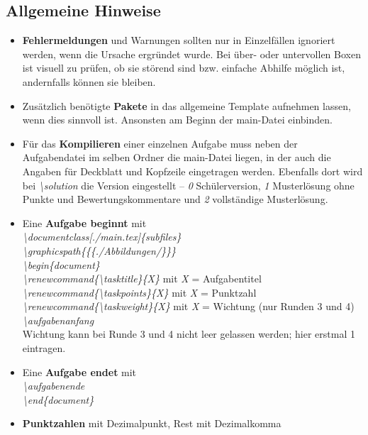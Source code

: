\documentclass[./main.tex]{subfiles}
\begin{document}
\subsection{Allgemeine Hinweise}
\begin{itemize}
    \item \textbf{Fehlermeldungen} und Warnungen sollten nur in Einzelf\"allen ignoriert werden, wenn die Ursache ergr\"undet wurde. Bei \"uber- oder untervollen Boxen ist visuell zu pr\"ufen, ob sie st\"orend sind bzw. einfache Abhilfe m\"oglich ist, andernfalls k\"onnen sie bleiben. 
    \item Zus\"atzlich ben\"otigte \textbf{Pakete} in das allgemeine Template aufnehmen lassen, wenn dies sinnvoll ist. Ansonsten am Beginn der main-Datei einbinden. 
    \item F\"ur das \textbf{Kompilieren} einer einzelnen Aufgabe muss neben der Aufgabendatei im selben Ordner die main-Datei liegen, in der auch die Angaben f\"ur Deckblatt und Kopfzeile eingetragen werden. Ebenfalls dort wird bei \hypertarget{solution}{\textit{\textbackslash solution}} die Version eingestellt -- \textit{0} Sch\"ulerversion, \textit{1} Musterl\"osung ohne Punkte und Bewertungskommentare und \textit{2} vollst\"andige Musterl\"osung. 
    \item Eine \textbf{Aufgabe beginnt} mit \\\textit{\textbackslash documentclass[./main.tex]\{subfiles\}\\\textbackslash graphicspath\{\{\subfix\{./Abbildungen/\}\}\}\\\textbackslash begin\{document\}\\\textbackslash renewcommand\{\textbackslash tasktitle\}\{X\}} mit \textit{X} = Aufgabentitel\\\textit{\textbackslash renewcommand\{\textbackslash taskpoints\}\{X\}} mit \textit{X} = Punktzahl\\\textit{\textbackslash renewcommand\{\textbackslash taskweight\}\{X\}} mit \textit{X} = Wichtung (nur Runden 3 und 4)\\
    \textit{\hypertarget{aufgabenanfang}{\textbackslash aufgabenanfang}}\\
    Wichtung kann bei Runde 3 und 4 nicht leer gelassen werden; hier erstmal 1 eintragen.
    \item Eine \textbf{Aufgabe endet} mit \\
    \textit{\hypertarget{aufgabenende}{\textbackslash aufgabenende}}\\\textit{\textbackslash end\{document\}}
    \item \textbf{Punktzahlen} mit Dezimalpunkt, Rest mit Dezimalkomma
     

\end{itemize}
\end{document}
